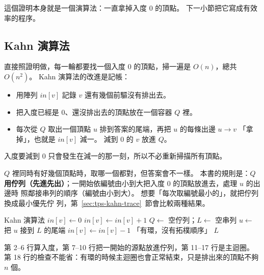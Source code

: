 這個證明本身就是一個演算法：一直拿掉入度 $0$ 的頂點。 下一小節把它寫成有效率的程序。

\subsection{Kahn 演算法}

直接照證明做，每一輪都要找一個入度 $0$ 的頂點，掃一遍是 $O(n)$，總共 $O(n^2)$。
Kahn 演算法的改進是記帳：
\begin{itemize}
\item 用陣列 $\mathit{in}[v]$ 記錄 $v$ 還有幾個前驅沒有排出去。
\item 把入度已經是 $0$、還沒排出去的頂點放在一個容器 $Q$ 裡。
\item 每次從 $Q$ 取出一個頂點 $u$ 排到答案的尾端，再把 $u$ 的每條出邊 $u \to v$
「拿掉」，也就是 $\mathit{in}[v]$ 減一。 減到 $0$ 的 $v$ 放進 $Q$。
\end{itemize}
入度要減到 $0$ 只會發生在減一的那一刻，所以不必重新掃描所有頂點。

$Q$ 裡同時有好幾個頂點時，取哪一個都對，但答案會不一樣。 本書的規則是：\textbf{$Q$
用佇列（先進先出）}；一開始依編號由小到大把入度 $0$ 的頂點放進去，處理 $u$ 的出邊時
照鄰接串列的順序（編號由小到大）。 想要「每次取編號最小的」，就把佇列換成最小優先佇
列，第~\ref{sec:tps-kahn-trace}~節會比較兩種結果。

\begin{pseudo}[label=alg:tps-kahn]{Kahn 演算法}
        \State $\mathit{in}[v] \gets 0$
    \EndFor
            \State $\mathit{in}[v] \gets \mathit{in}[v] + 1$
        \EndFor
    \EndFor
    \State $Q \gets$ 空佇列；$L \gets$ 空串列
     
            \State {}
        \EndIf
    \EndFor
        \State $u \gets$ 
        \State 把 $u$ 接到 $L$ 的尾端
         
            \State $\mathit{in}[v] \gets \mathit{in}[v] - 1$
                \State {}
            \EndIf
        \EndFor
    \EndWhile
        \State \Return 「有環，沒有拓樸順序」
    \EndIf
    \State \Return $L$
\EndFunction
\end{pseudo}

第 2--6 行算入度，第 7--10 行把一開始的源點放進佇列，第 11--17 行是主迴圈。 第 18
行的檢查不能省：有環的時候主迴圈也會正常結束，只是排出來的頂點不夠 $n$ 個。

